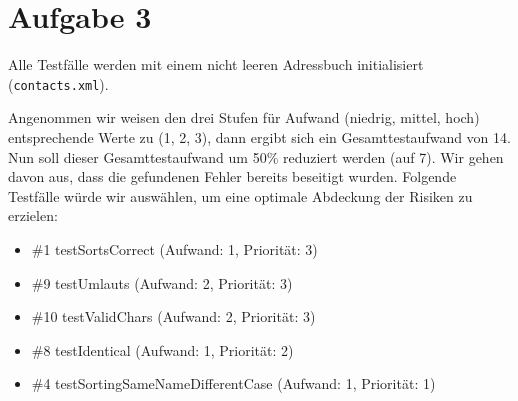 \section{Aufgabe 3}
Alle Testfälle werden mit einem nicht leeren Adressbuch initialisiert (\texttt{contacts.xml}).

Angenommen wir weisen den drei Stufen für Aufwand (niedrig, mittel, hoch) entsprechende Werte zu (1, 2, 3), dann ergibt sich ein Gesamttestaufwand von 14. Nun soll dieser Gesamttestaufwand um 50\% reduziert werden (auf 7). Wir gehen davon aus, dass die gefundenen Fehler bereits beseitigt wurden. Folgende Testfälle würde wir auswählen, um eine optimale Abdeckung der Risiken zu erzielen:

\begin{itemize}
\item \#1 testSortsCorrect (Aufwand: 1, Priorität: 3)
\item \#9 testUmlauts (Aufwand: 2, Priorität: 3)
\item \#10 testValidChars (Aufwand: 2, Priorität: 3)
\item \#8 testIdentical (Aufwand: 1, Priorität: 2)
\item \#4 testSortingSameNameDifferentCase (Aufwand: 1, Priorität: 1)
\end{itemize}
